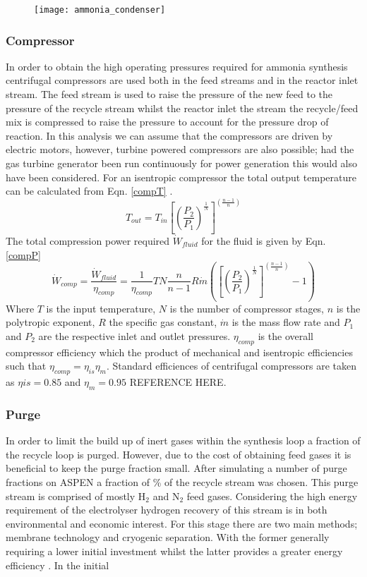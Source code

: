 {{\begin{figure}[h]
		\centering
		
		\texttt{[image: ammonia\_condenser]}
	\end{figure}
}

\subsubsection{Compressor}
In order to obtain the high operating pressures required for ammonia synthesis centrifugal compressors are used both in the feed streams and in the reactor inlet stream. The feed stream is used to raise the pressure of the new feed to the pressure of the recycle stream whilst the reactor inlet the stream the recycle/feed mix is compressed to raise the pressure to account for the pressure drop of reaction. In this analysis we can assume that the compressors are driven by electric motors, however, turbine powered compressors are also possible; had the gas turbine generator been run continuously for power generation this would also have been considered. 
For an isentropic compressor the total output temperature can be calculated from Eqn. \ref{compT} \cite{Morgan2013}.
\begin{equation}
\label{compT}
T_{out} = T_{in}\left[ \left( \frac{P_2}{P_1}\right)^{\frac{1}{N}} \right]^{\left( \frac{n-1}{n}\right)} 
\end{equation}
The total 
compression power required $\dot W_{fluid}$ for the fluid is given by Eqn. \ref{compP}
\begin{equation}
\label{compP}
\dot W_{comp} = \frac{ \dot W_{fluid}}{\eta_{comp}} = \frac{1}{\eta_{comp}} TN\frac{n}{n-1}R\dot m \left( \left[ \left( \frac{P_2}{P_1}\right)^{\frac{1}{N}} \right]^{\left( \frac{n-1}{n}\right)} - 1 \right)
\end{equation}
Where $T$ is the input temperature, $N$ is the number of compressor stages, $n$ is the polytropic exponent, $R$ the specific gas constant, $\dot m$ is the mass flow rate and $P_1$ and $P_2$ are the respective inlet and outlet pressures. $\eta_{comp}$ is the overall compressor efficiency which the product of mechanical and isentropic efficiencies such that $\eta_{comp} =\eta_{is}\eta_{m}$. Standard efficiences of centrifugal compressors are taken as $\eta{is} = 0.85$ and $\eta_m = 0.95$ REFERENCE HERE. 

\subsubsection{Purge}
In order to limit the build up of inert gases within the synthesis loop a fraction of the recycle loop is purged. However, due to the cost of obtaining feed gases it is beneficial to keep the purge fraction small. After simulating a number of purge fractions on ASPEN a fraction of \purge \%  of the recycle stream was chosen. This purge stream is comprised of mostly H$_2$ and N$_2$ feed gases. Considering the high energy requirement of the electrolyser hydrogen recovery of this stream is in both environmental and economic interest. For this stage there are two main methods; membrane technology and cryogenic separation. With the former generally requiring a lower initial investment whilst the latter provides a greater energy efficiency \cite{Ojha2010}. In the initial 

}

